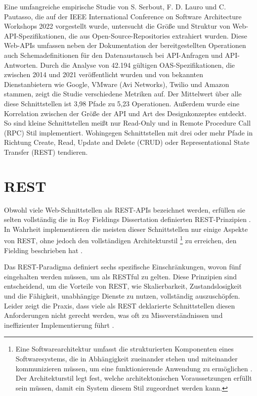 \documentclass[draft,final]{vutinfth} %
\begin{document}
Eine umfangreiche empirische Studie von S. Serbout,  F. D. Lauro und C. Pautasso, die auf der IEEE International Conference on Software Architecture Workshops 2022 vorgestellt wurde, untersucht die Größe und Struktur von Web-API-Spezifikationen, die aus Open-Source-Repositories extrahiert wurden. Diese Web-APIs umfassen neben der Dokumentation der bereitgestellten Operationen auch Schemadefinitionen für den Datenaustausch bei API-Anfragen und API-Antworten. 
Durch die Analyse von 42.194 gültigen OAS-Spezifikationen, die zwischen 2014 und 2021 veröffentlicht wurden und von bekannten Dienstanbietern wie Google, VMware (Avi Networks), Twilio und Amazon stammen, zeigt die Studie verschiedene Metriken auf. 
Der Mittelwert über alle diese Schnittstellen ist 3,98 Pfade zu 5,23 Operationen. 
Außerdem wurde eine Korrelation zwischen der Größe der API und Art des Designkonzeptes entdeckt. 
So sind kleine Schnittstellen meißt nur Read-Only und in Remote Procedure Call (RPC) Stil implementiert. 
Wohingegen Schnittstellen mit drei oder mehr Pfade in Richtung Create, Read, Update and Delete (CRUD) oder Representational State Transfer (REST) tendieren. \cite{Serbout:2022:WebApiStructures}


\section{REST}


Obwohl viele Web-Schnittstellen als REST-APIs bezeichnet werden, erfüllen sie selten vollständig die in Roy Fieldings Dissertation definierten REST-Prinzipien \cite{Neumann:2021:AnalysisOfRest}. 
In Wahrheit implementieren die meisten dieser Schnittstellen nur einige Aspekte von REST, ohne jedoch den vollständigen Architekturstil
\footnote{
	Eine Softwarearchitektur umfasst die strukturierten Komponenten eines Softwaresystems, die in Abhängigkeit zueinander stehen und miteinander kommunizieren müssen, um eine funktionierende Anwendung zu ermöglichen \cite{Fielding:2000:REST}. 
	Der Architekturstil legt fest, welche architektonischen Voraussetzungen erfüllt sein müssen, damit ein System diesem Stil zugeordnet werden kann.
}
zu erreichen, den Fielding beschrieben hat \cite{Neumann:2021:AnalysisOfRest}.

Das REST-Paradigma definiert sechs spezifische Einschränkungen, wovon fünf eingehalten werden müssen, um als RESTful zu gelten. 
Diese Prinzipien sind entscheidend, um die Vorteile von REST, wie Skalierbarkeit, Zustandslosigkeit und die Fähigkeit, unabhängige Dienste zu nutzen, vollständig auszuschöpfen. 
Leider zeigt die Praxis, dass viele als REST deklarierte Schnittstellen diesen Anforderungen nicht gerecht werden, was oft zu Missverständnissen und ineffizienter Implementierung führt \cite{Neumann:2021:AnalysisOfRest}.
\end{document}
